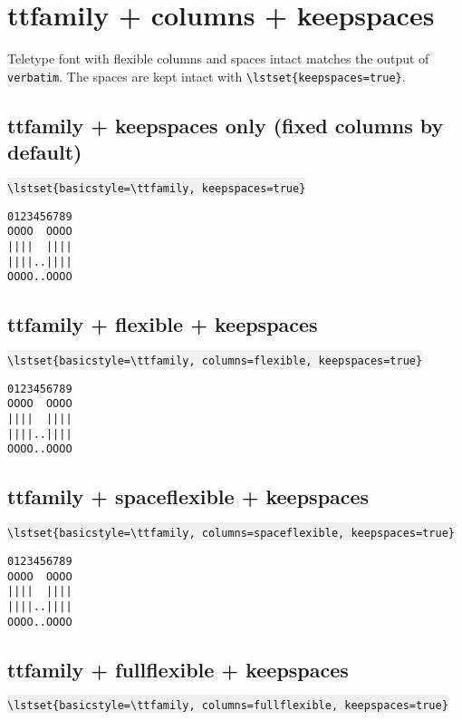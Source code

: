 \documentclass{article}
\newcommand{\bs}{\textbackslash}
\newcommand{\ttt}[1]{\colorbox[HTML]{f0f0f0}{\texttt{#1}}}
\begin{document}
\section{ttfamily + columns + keepspaces}
Teletype font with flexible columns and spaces intact matches the output
of \ttt{verbatim}. The spaces are kept intact with
\ttt{\bs{}lstset\{keepspaces=true\}}.

\subsection{ttfamily + keepspaces only (fixed columns by default)}
\ttt{\bs{}lstset\{basicstyle=\bs{}ttfamily, keepspaces=true\}}

{
\lstset{basicstyle=\ttfamily, keepspaces=true}
\begin{lstlisting}
0123456789
OOOO  OOOO
||||  ||||
||||..||||
OOOO..OOOO
\end{lstlisting}
}

\subsection{ttfamily + flexible + keepspaces}
\ttt{\bs{}lstset\{basicstyle=\bs{}ttfamily, columns=flexible,
                     keepspaces=true\}}

{
\lstset{basicstyle=\ttfamily, columns=flexible, keepspaces=true}
\begin{lstlisting}
0123456789
OOOO  OOOO
||||  ||||
||||..||||
OOOO..OOOO
\end{lstlisting}
}

\subsection{ttfamily + spaceflexible + keepspaces}
\ttt{\bs{}lstset\{basicstyle=\bs{}ttfamily, columns=spaceflexible,
                     keepspaces=true\}}
{
\lstset{basicstyle=\ttfamily, columns=spaceflexible, keepspaces=true}
\begin{lstlisting}
0123456789
OOOO  OOOO
||||  ||||
||||..||||
OOOO..OOOO
\end{lstlisting}
}

\subsection{ttfamily + fullflexible + keepspaces}
\ttt{\bs{}lstset\{basicstyle=\bs{}ttfamily, columns=fullflexible,
                     keepspaces=true\}}
\end{document}
